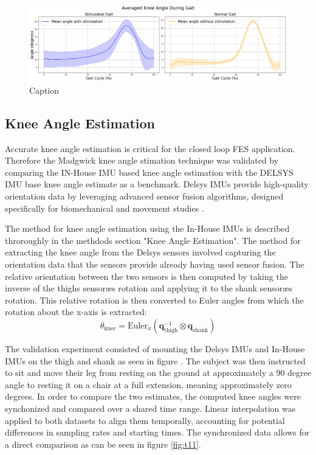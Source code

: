 \begin{figure} [h]
    \centering
    \includegraphics[width=0.95\linewidth]{images/leonioutput1.png}
    \caption{Caption}
    \label{fig:enter-label}
\end{figure}


\subsection{Knee Angle Estimation}
Accurate knee angle estimation is critical for the closed loop FES application. Therefore the Madgwick knee angle stimation technique was validated by comparing the IN-House IMU based knee angle estimation with the DELSYS IMU base knee angle estimate as a benchmark. Delsys IMUs provide high-quality orientation data by leveraging advanced sensor fusion algorithms, designed specifically for biomechanical and movement studies . 


The method for knee angle estimation using the In-House IMUs is described throroughly in the methdods section "Knee Angle Estimation". The method for extracting the knee angle from the Delsys sensors involved capturing the orientation data that the sensors provide already having used sensor fusion. The relative orientation between the two sensors is then computed by taking the inverse of the thighs sensoræs rotation and applying it to the shank sensoræs rotation. This relative rotation is then converted to Euler angles from which the rotation about the x-axis is extracted:
\begin{equation}
    \theta_{\text{knee}} = \text{Euler}_x \left( \mathbf{q}_{\text{thigh}}^{-1} \otimes \mathbf{q}_{\text{shank}} \right)
\end{equation}

The validation experiment consisted of mounting the Delsys IMUs and In-House IMUs on the thigh and shank as seen in figure . The subject was then instructed to sit and move their leg from resting on the ground at approximately a 90 degree angle to resting it on a chair at a full extension, meaning approximately zero degrees. In order to compare the two estimates, the computed knee angles were synchonized and compared over a shared time range. Linear interpolation was applied to both datasets to align them temporally, accounting for potential differences in sampling rates and starting times. The synchronized data allows for a direct comparison as can be seen in figure \ref{fig:t11}. 

